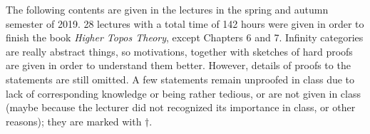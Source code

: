 The following contents are given in the lectures in the spring and autumn semester of 2019. 28 lectures with a total time of 142 hours 
were given in order to finish the book \textit{Higher Topos Theory}, except Chapters 6 and 7. Infinity categories are
really abstract things, so motivations, together with sketches of hard proofs are given in order to understand them better. 
However, details of proofs to the statements are still omitted. A few statements 
remain unproofed in class due to lack of corresponding knowledge or being rather tedious, or are not given in class
(maybe because the lecturer did not recognized its importance in class, or other reasons); they are marked with $\dagger$.